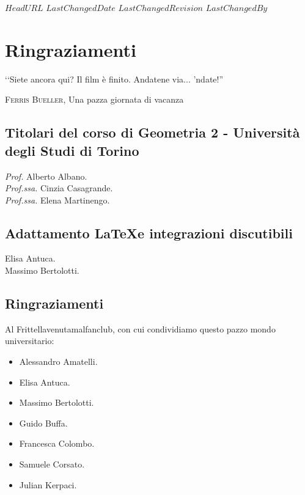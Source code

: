\svnidlong
{$HeadURL$}
{$LastChangedDate$}
{$LastChangedRevision$}
{$LastChangedBy$}

\chapter{Ringraziamenti}

\begin{introduction}
  ‘‘Siete ancora qui? Il film è finito. Andatene via... 'ndate!''
	\begin{flushright}
		\textsc{Ferris Bueller,} Una pazza giornata di vacanza
	\end{flushright}
\end{introduction}

\section*{Titolari del corso di Geometria 2 - Università degli Studi di Torino}

\textit{Prof.} Alberto Albano.\\
\textit{Prof.ssa.} Cinzia Casagrande.\\
\textit{Prof.ssa.} Elena Martinengo.

\section*{Adattamento \LaTeX e integrazioni discutibili}
Elisa Antuca.\\
Massimo Bertolotti.

\section*{Ringraziamenti}
Al Frittellavenutamalfanclub, con cui condividiamo questo pazzo mondo universitario:
\begin{itemize}
	\item Alessandro Amatelli.
	\item Elisa Antuca.
	\item Massimo Bertolotti.
	\item Guido Buffa.
	\item Francesca Colombo.
	\item Samuele Corsato.
	\item Julian Kerpaci.
\end{itemize}